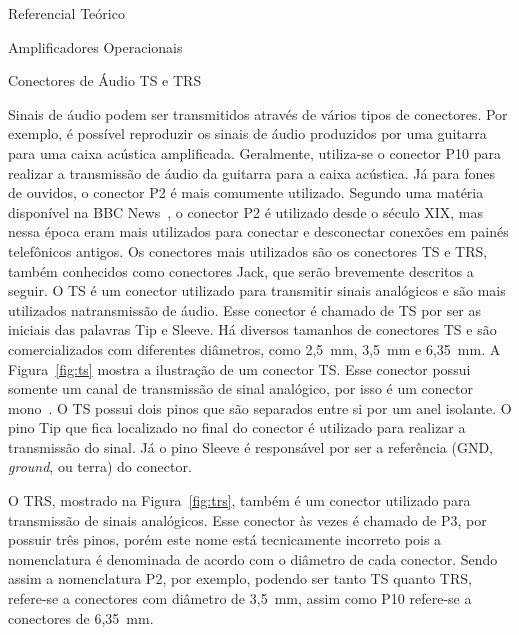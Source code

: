 \begin{chapter}{Referencial Teórico}
\begin{section}{Amplificadores Operacionais}
\end{section}


\begin{section}{Conectores de Áudio TS e TRS}

Sinais de áudio podem ser transmitidos através de vários tipos de conectores.
Por exemplo, é possível reproduzir os sinais de áudio produzidos por uma
guitarra para uma caixa acústica amplificada. Geralmente, utiliza-se o conector
P10 para realizar a transmissão de áudio da guitarra para a caixa acústica. Já
para fones de ouvidos, o conector P2 é mais comumente utilizado. Segundo uma
matéria disponível na BBC News~\cite{BBC}, o conector P2 é utilizado desde o
século XIX, mas nessa época eram mais utilizados para conectar e desconectar 
conexões em painés telefônicos antigos. Os conectores mais utilizados são os 
conectores TS e TRS, também conhecidos como conectores Jack, que serão 
brevemente descritos a seguir.  
\newpage
O TS é um conector utilizado para transmitir sinais analógicos e são mais
utilizados natransmissão de áudio. Esse conector é chamado de TS por ser as
iniciais das palavras Tip e Sleeve. Há diversos tamanhos de
conectores TS e são comercializados com diferentes diâmetros, como 2,5~mm,
3,5~mm e 6,35~mm. A Figura~\ref{fig:ts} mostra a ilustração de um conector TS.
Esse conector possui somente um canal de transmissão de sinal analógico, por
isso é um conector mono~\cite{ts}. O TS possui dois pinos que são separados
entre si por um anel isolante. O pino Tip que  fica localizado no final do
conector é utilizado para realizar a  transmissão do sinal. Já o pino Sleeve é
responsável por ser a referência (GND, \textit{ground}, ou terra) do conector.


O TRS, mostrado na Figura~\ref{fig:trs}, também é um conector utilizado para
transmissão de sinais analógicos. Esse conector às vezes é chamado de P3, por
possuir três pinos, porém este nome está tecnicamente incorreto pois a
nomenclatura é denominada de acordo com o diâmetro de cada conector. Sendo assim
a nomenclatura P2, por exemplo, podendo ser tanto TS quanto TRS,  refere-se a
conectores com diâmetro de 3,5~mm, assim como P10 refere-se a conectores de
6,35~mm. 



\end{section}
\end{chapter}
